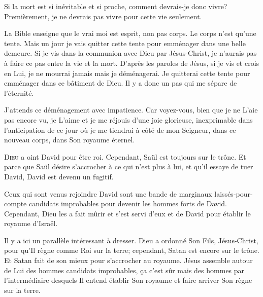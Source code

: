 Si la mort est si inévitable et si proche, comment devrais-je donc vivre?
 Premièrement, je ne devrais pas vivre pour cette vie seulement.


La Bible enseigne que le vrai moi est esprit, non pas corps.
 Le corps n'est qu'une tente. Mais un jour je vais quitter cette tente
 pour emménager dans une belle demeure.
 Si je vis dans la communion avec Dieu par Jésus-Christ,
 je n'aurais pas à faire ce pas entre la vie et la mort.
 D'après les paroles de Jésus, si je vis et crois en Lui, je ne mourrai jamais
 \ocadr mais je déménagerai.
 Je quitterai cette tente pour emménager dans ce bâtiment de Dieu.
 Il y a donc un pas qui me sépare de l'éternité.

J'attends ce déménagement avec impatience.
 Car voyez-vous, bien que je ne L'aie pas encore vu,
 je L'aime et je me réjouis d'une joie glorieuse,
 inexprimable dans l'anticipation de ce jour où je me tiendrai
 à côté de mon Seigneur, dans ce nouveau corps, dans Son royaume éternel. 

\dvrule







\lettrine{D}{ieu} a oint David pour être roi.
 Cependant, Saül est toujours sur le trône.
 Et parce que Saül désire s'accrocher à ce qui n'est plus à lui,
 et qu'il essaye de tuer David, David est devenu un fugitif.

Ceux qui sont venus rejoindre David sont une bande de marginaux
 laissés-pour-compte \ocadr candidats improbables pour devenir
 les hommes forts de David.
 Cependant, Dieu les a fait mûrir et s'est servi d'eux
 et de David pour établir le royaume d'Israël.

Il y a ici un parallèle intéressant à dresser.
 Dieu a ordonné Son Fils, Jésus-Christ, pour qu'Il règne comme Roi sur la terre;
 cependant, Satan est encore sur le trône.
 Et Satan fait de son mieux pour s'accrocher au royaume.
 Jésus assemble autour de Lui des hommes
 \ocadr candidats improbables, \c{c}a c'est sûr \fcadr
 mais des hommes par l'intermédiaire desquels Il entend établir Son royaume
 et faire arriver Son règne sur la terre.

